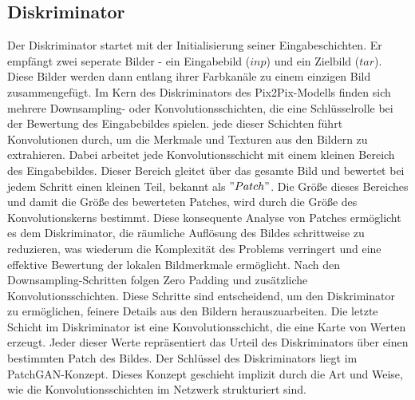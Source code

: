 \subsection{Diskriminator}
Der Diskriminator startet mit der Initialisierung seiner Eingabeschichten. Er empfängt zwei seperate Bilder - ein Eingabebild ($inp$) und ein Zielbild ($tar$). Diese Bilder werden dann entlang ihrer Farbkanäle zu einem einzigen Bild zusammengefügt.\newline
Im Kern des Diskriminators des Pix2Pix-Modells finden sich mehrere Downsampling- oder Konvolutionsschichten, die eine Schlüsselrolle bei der Bewertung des Eingabebildes spielen. jede dieser Schichten führt Konvolutionen durch, um die Merkmale und Texturen aus den Bildern zu extrahieren. Dabei arbeitet jede Konvolutionsschicht mit einem kleinen Bereich des Eingabebildes. Dieser Bereich gleitet über das gesamte Bild und bewertet bei jedem Schritt einen kleinen Teil, bekannt als $"Patch"$. Die Größe dieses Bereiches und damit die Größe des bewerteten Patches, wird durch die Größe des Konvolutionskerns bestimmt. Diese konsequente Analyse von Patches ermöglicht es dem Diskriminator, die räumliche Auflösung des Bildes schrittweise zu reduzieren, was wiederum die Komplexität des Problems verringert und eine effektive Bewertung der lokalen Bildmerkmale ermöglicht. \newline
Nach den Downsampling-Schritten folgen Zero Padding und zusätzliche Konvolutionsschichten. Diese Schritte sind entscheidend, um den Diskriminator zu ermöglichen, feinere Details aus den Bildern herauszuarbeiten. \newline
Die letzte Schicht im Diskriminator ist eine Konvolutionsschicht, die eine Karte von Werten erzeugt. Jeder dieser Werte repräsentiert das Urteil des Diskriminators über einen bestimmten Patch des Bildes.\newline
Der Schlüssel des Diskriminators liegt im PatchGAN-Konzept. Dieses Konzept geschieht implizit durch die Art und Weise, wie die Konvolutionsschichten im Netzwerk strukturiert sind.
\newpage
